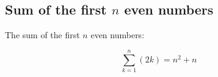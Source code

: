 \subsection{Sum of the first $n$ even numbers}

The sum of the first $n$ even numbers:

\[
\sum_{k = 1}^{n} (2k) = n^2 + n
\]